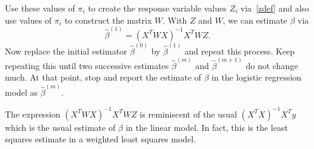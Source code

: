 \documentclass{scrartcl}
\begin{document}
Use these values of $\pi_i$ to create the response variable values $Z_i$
via~\eqref{zdef} and also use values of $\pi_i$ to construct the matrix
$W$. With $Z$ and $W$, we can estimate $\beta$ via 
\begin{equation*}
  \hat{\beta}^{(1)} = (X^T W X)^{-1} X^T W Z. 
\end{equation*}
Now replace the initial estimator $\hat{\beta}^{(0)}$ by
$\hat{\beta}^{(1)}$ and repeat this process. Keep repeating this until
two successive estimates $\hat{\beta}^{(m)}$ and $\hat{\beta}^{(m+1)}$
do not change much. At that point, stop and report the estimate of
$\beta$ in the logistic regression model as $\hat{\beta}^{(m)}$. 

The expression $(X^T W X)^{-1} X^T W Z$ is reminiscent of the usual
$(X^T X)^{-1} X^T y$ which is the usual estimate of $\beta$ in the
linear model. In fact, this is the least squares estimate in a
weighted least squares model. 






  


  
 
\end{document}
